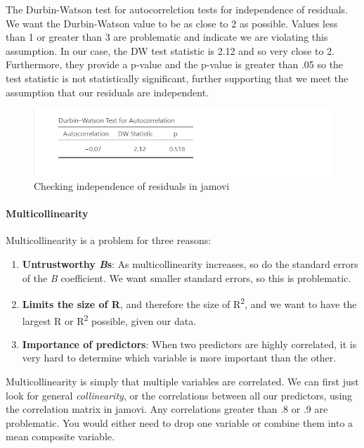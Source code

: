 \documentclass[
]{book}
\providecommand{\tightlist}{%
  \setlength{\itemsep}{0pt}\setlength{\parskip}{0pt}}
\begin{document}
The Durbin-Watson test for autocorrelction tests for independence of residuals. We want the Durbin-Watson value to be as close to 2 as possible. Values less than 1 or greater than 3 are problematic and indicate we are violating this assumption. In our case, the DW test statistic is 2.12 and so very close to 2. Furthermore, they provide a p-value and the p-value is greater than .05 so the test statistic is not statistically significant, further supporting that we meet the assumption that our residuals are independent.

\begin{figure}

{\centering \includegraphics[width=1\linewidth]{images/13-regression/regression-durbinwatson} 

}

\caption{Checking independence of residuals in jamovi}\label{fig:unnamed-chunk-8}
\end{figure}

\hypertarget{multicollinearity}{%
\paragraph{Multicollinearity}\label{multicollinearity}}

Multicollinearity is a problem for three reasons:

\begin{enumerate}
\def\labelenumi{\arabic{enumi}.}
\tightlist
\item
  \textbf{Untrustworthy \emph{B}s}: As multicollinearity increases, so do the standard errors of the \emph{B} coefficient. We want smaller standard errors, so this is problematic.
\item
  \textbf{Limits the size of R}, and therefore the size of R\textsuperscript{2}, and we want to have the largest R or R\textsuperscript{2} possible, given our data.
\item
  \textbf{Importance of predictors}: When two predictors are highly correlated, it is very hard to determine which variable is more important than the other.
\end{enumerate}

Multicollinearity is simply that multiple variables are correlated. We can first just look for general \emph{collinearity}, or the correlations between all our predictors, using the correlation matrix in jamovi. Any correlations greater than .8 or .9 are problematic. You would either need to drop one variable or combine them into a mean composite variable.
\end{document}
